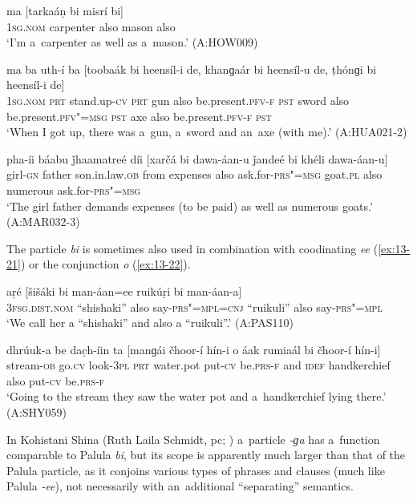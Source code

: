 \begin{exe}
\ex
\label{ex:13-18}
\gll ma [tarkaáṇ bi misrí bi]  \\
\textsc{1sg.nom} carpenter also mason also \\
\glt `I'm a~carpenter as well as a~mason.' (A:HOW009)

\ex
\label{ex:13-19}
\gll ma ba uth-í ba [toobaák bi heensíl-i de, khanɡaár bi heensíl-u de, ṭhónɡi bi heensíl-i de] \\
\textsc{1sg.nom} \textsc{prt} stand.up-\textsc{cv} \textsc{prt} gun also  be.present.\textsc{pfv-f} \textsc{pst} sword also be.present.\textsc{pfv"=msg } \textsc{pst} axe also be.present.\textsc{pfv-f } \textsc{pst} \\
\glt `When I got up, there was a~gun, a~sword and an~axe (with me).' (A:HUA021-2)

\ex
\label{ex:13-20}
\gll pha-íi báabu ǰhaamatreé díi [xarčá bi dawa-áan-u ǰandeé bi khéli dawa-áan-u]  \\
girl-\textsc{gn} father son.in.law.\textsc{ob} from expenses also  ask.for-\textsc{prs"=msg} goat.\textsc{pl} also numerous ask.for-\textsc{prs"=msg} \\
\glt `The girl father demands expenses (to be paid) as well as numerous goats.' (A:MAR032-3) 
\end{exe}

The particle \textit{bi} is sometimes also used in combination with coodinating \textit{ee} (\ref{ex:13-21}) or the conjunction \textit{o} (\ref{ex:13-22}).

\begin{exe}
\ex
\label{ex:13-21}
\gll aṛé  [šišáki  bi man-áan=ee  ruikúṛi bi man-áan-a] \\
\textsc{3fsg.dist.nom} ``shishaki'' also say-\textsc{prs"=mpl=cnj}  ``ruikuli'' also say-\textsc{prs"=mpl}\\
\glt `We call her a ``shishaki'' and also a ``ruikuli''.' (A:PAS110)

\ex
\label{ex:13-22}
\gll dhrúuk-a be dac̣h-íin ta [manɡái čhoor-í hín-i o áak rumiaál bi čhoor-í hín-i]  \\
stream-\textsc{ob} go.\textsc{cv} look-\textsc{3pl} \textsc{prt} water.pot put-\textsc{cv}  be.\textsc{prs-f} and \textsc{idef } handkerchief also put-\textsc{cv} be.\textsc{prs-f } \\
\glt `Going to the stream they saw the water pot and a~handkerchief lying there.' (A:SHY059) 
\end{exe}

In Kohistani Shina (Ruth Laila Schmidt, pc; \citealt[252]{schmidtkohistani2008}) a~particle \textit{-ɡa} has a~function comparable to Palula \textit{bi}, but its scope is apparently much larger than that of the Palula particle, as it conjoins various types of phrases and clauses (much like Palula \textit{-ee}), not necessarily with an~additional ``separating'' semantics. 



